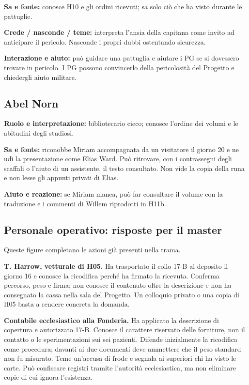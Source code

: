 \documentclass[11pt,a4paper]{article}
\begin{document}
\textbf{Sa e fonte:} conosce H10 e gli ordini ricevuti; sa solo ciò che ha visto durante le pattuglie.

\textbf{Crede / nasconde / teme:} interpreta l'ansia della capitana come invito ad anticipare il pericolo. Nasconde i propri dubbi ostentando sicurezza.

\textbf{Interazione e aiuto:} può guidare una pattuglia e aiutare i PG se si dovessero trovare in pericolo. I PG possono convincerlo della pericolosità del Progetto e chiedergli aiuto militare.

\subsection{Abel Norn}
\textbf{Ruolo e interpretazione:} bibliotecario cieco; conosce l'ordine dei volumi e le abitudini degli studiosi.

\textbf{Sa e fonte:} riconobbe Miriam accompagnata da un visitatore il giorno 20 e ne udì la presentazione come Elias Ward. Può ritrovare, con i contrassegni degli scaffali o l'aiuto di un assistente, il testo consultato. Non vide la copia della runa e non lesse gli appunti privati di Elias.

\textbf{Aiuto e reazione:} se Miriam manca, può far consultare il volume con la traduzione e i commenti di Willem riprodotti in H11b.

\subsection{Personale operativo: risposte per il master}
Queste figure completano le azioni già presenti nella trama. 

\textbf{T. Harrow, vetturale di H05.} Ha trasportato il collo 17-B al deposito il giorno 16 e conosce la ricodifica perché ha firmato la ricevuta. Conferma percorso, peso e firma; non conosce il contenuto oltre la descrizione e non ha consegnato la cassa nella sala del Progetto. Un colloquio privato o una copia di H05 basta a rendere concreta la domanda.

\textbf{Contabile ecclesiastico alla Fonderia.} Ha applicato la descrizione di copertura e autorizzato 17-B. Conosce il carattere riservato delle forniture, non il contatto o le sperimentazioni sui sei pazienti. Difende inizialmente la ricodifica come procedura; davanti ai due documenti deve ammettere che il peso standard non fu misurato. Teme un'accusa di frode e segnala ai superiori chi ha visto le carte. Può confiscare registri tramite l'autorità ecclesiastica, ma non eliminare copie di cui ignora l'esistenza.
\end{document}
